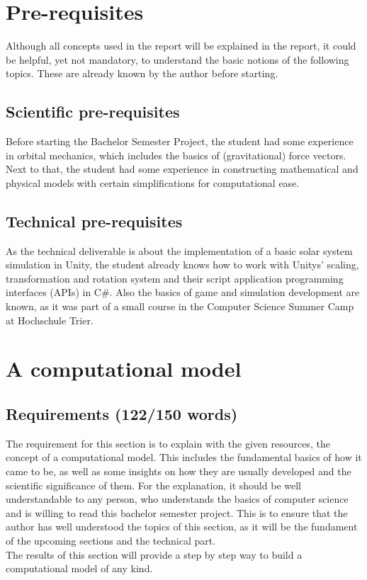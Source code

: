 \documentclass[conference,compsoc]{IEEEtran}
\begin{document}

\section{Pre-requisites} 
Although all concepts used in the report will be explained in the report, it could be helpful, yet not mandatory, to understand the basic notions of the following topics. These are already known by the author before starting. 
\subsection{Scientific pre-requisites}
Before starting the Bachelor Semester Project, the student had some experience in orbital mechanics, which includes the basics of (gravitational) force vectors. \\
Next to that, the student had some experience in constructing mathematical and physical models with certain simplifications for computational ease.
\subsection{Technical pre-requisites}
As the technical deliverable is about the implementation of a basic solar system simulation in Unity, the student already knows how to work with Unitys' scaling, transformation and rotation system and their script application programming interfaces (APIs) in C\#. Also the basics of game and simulation development are known, as it was part of a small course in the Computer Science Summer Camp at Hochschule Trier.

\section{A computational model}
\label{sec-computational-model}
\subsection{Requirements (122/150 words)}
The requirement for this section is to explain with the given resources, the concept of a computational model. This includes the fundamental basics of how it came to be, as well as some insights on how they are usually developed and the scientific significance of them. For the explanation, it should be well understandable to any person, who understands the basics of computer science and is willing to read this bachelor semester project. This is to ensure that the author has well understood the topics of this section, as it will be the fundament of the upcoming sections and the technical part.\\
The results of this section will provide a step by step way to build a computational model of any kind. 
\end{document}
